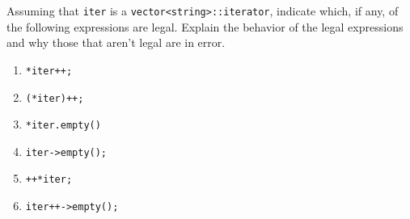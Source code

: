 %
%
\begin{question}
Assuming that \verb|iter| is a \verb|vector<string>::iterator|,
indicate which, if any, of the following expressions are legal. Explain the
behavior of the legal expressions and why those that aren’t legal are in error.
\begin{enumerate}[label=(\alph*)]
^^I\item \verb|*iter++;|
^^I\item \verb|(*iter)++;|
^^I\item \verb|*iter.empty()|
^^I\item \verb|iter->empty();|
^^I\item \verb|++*iter;|
^^I\item \verb|iter++->empty();|
\end{enumerate}
\end{question}
